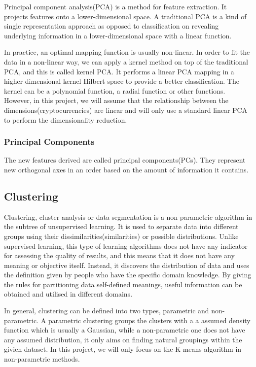 \documentclass[11pt]{article} %
\theoremstyle{plain}
\theoremstyle{definition}
\begin{document}
Principal component analysis(PCA) is a method for feature extraction. It projects features onto a lower-dimensional space. A traditional PCA is a kind of single representation approach as opposed to classification on revealing underlying information in a lower-dimensional space with a linear function. 

In practice, an optimal mapping function is usually non-linear. In order to fit the data in a non-linear way, we can apply a kernel method on top of the traditional PCA, and this is called kernel PCA. It performs a linear PCA mapping in a higher dimensional kernel Hilbert space to provide a better classification. The kernel can be a polynomial function, a radial function or other functions\cite{hessam/kpca:2014}. However, in this project, we will assume that the relationship between the dimensions(cryptocurrencies) are linear and will only use a standard linear PCA to perform the dimensionality reduction.

\subsubsection{Principal Components}

The new features derived are called principal components(PCs). They represent new orthogonal axes in an order based on the amount of information it contains. 



\subsection{Clustering}

Clustering, cluster analysis or data segmentation is a non-parametric algorithm in the subtree of unsupervised learning. It is used to separate data into different groups using their dissimilarities(similarities) or possible distributions. Unlike supervised learning, this type of learning algorithms does not have any indicator for assessing the quality of results, and this means that it does not have any meaning or objective itself. Instead, it discovers the distribution of data and uses the definition given by people who have the specific domain knowledge. By giving the rules for partitioning data self-defined meanings, useful information can be obtained and utilised in different domains\cite{hastie/etal:2009}.

In general, clustering can be defined into two types, parametric and non-parametric. A parametric clustering groups the clusters with a a assumed density function which is usually a Gaussian, while a non-parametric one does not have any assumed distribution, it only aims on finding natural groupings within the givien dataset. In this project, we will only focus on the K-means algorithm in non-parametric methods.
\end{document}
